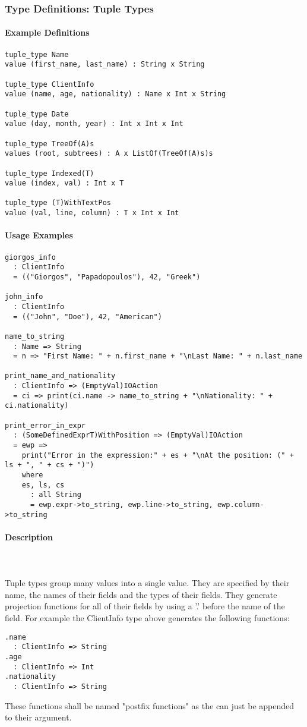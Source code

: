 \documentclass{article}
\def\pend{\mbox{} \\\\}
\begin{document}
\subsubsection{Type Definitions: Tuple Types}
\label{subsubsec:tupts}

\paragraph{Example Definitions}

\begin{verbatim}
tuple_type Name
value (first_name, last_name) : String x String

tuple_type ClientInfo
value (name, age, nationality) : Name x Int x String

tuple_type Date
value (day, month, year) : Int x Int x Int

tuple_type TreeOf(A)s
values (root, subtrees) : A x ListOf(TreeOf(A)s)s

tuple_type Indexed(T)
value (index, val) : Int x T

tuple_type (T)WithTextPos
value (val, line, column) : T x Int x Int
\end{verbatim}

\paragraph{Usage Examples}

\begin{verbatim}
giorgos_info
  : ClientInfo
  = (("Giorgos", "Papadopoulos"), 42, "Greek")

john_info
  : ClientInfo
  = (("John", "Doe"), 42, "American")

name_to_string
  : Name => String
  = n => "First Name: " + n.first_name + "\nLast Name: " + n.last_name

print_name_and_nationality
  : ClientInfo => (EmptyVal)IOAction
  = ci => print(ci.name -> name_to_string + "\nNationality: " + ci.nationality)

print_error_in_expr
  : (SomeDefinedExprT)WithPosition => (EmptyVal)IOAction
  = ewp =>
    print("Error in the expression:" + es + "\nAt the position: (" + ls + ", " + cs + ")")
    where
    es, ls, cs
      : all String
      = ewp.expr->to_string, ewp.line->to_string, ewp.column->to_string
\end{verbatim}

\paragraph{Description}\pend
Tuple types group many values into a single value. They are specified by their name,
the names of their fields and the types of their fields. They generate 
projection functions for all of their fields by using a '.' before the name of 
the field. For example the ClientInfo type above generates the following 
functions:
\begin{verbatim}
.name
  : ClientInfo => String
.age
  : ClientInfo => Int
.nationality
  : ClientInfo => String
\end{verbatim}
These functions shall be named "postfix functions" as the can just be appended to
their argument.
\end{document}
